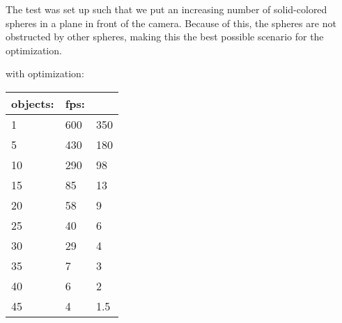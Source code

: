 			The test was set up such that we put an increasing number of solid-colored spheres in a 
			plane in front of the camera. Because of this, the spheres are not obstructed
			by other spheres, making this the best possible scenario for the optimization.

			with optimization:

			\begin{tabular}{lll}
				objects: & fps:	\\ \hline 
				1	& 600 & 350	\\ 
				5	& 430 & 180	\\			
				10	& 290 & 98	\\
				15	& 85 & 13	\\
				20	& 58 & 9	\\
				25	& 40 & 6	\\
				30	& 29 & 4	\\
				35	& 7 & 3		\\
				40	& 6 & 2		\\
				45	& 4	& 1.5	\\
			\end{tabular}



		
		
		

